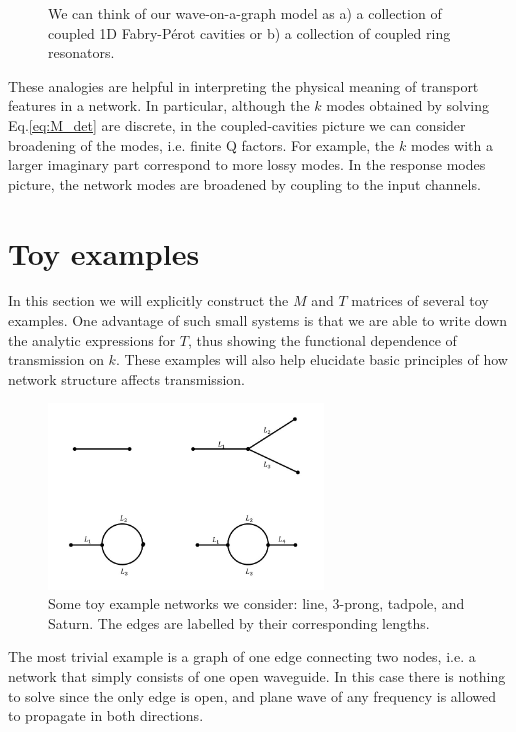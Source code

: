 \begin{figure}[h]
\begin{subfigure}[b]{0.3\textwidth}
        \caption{}
    \end{subfigure}
    
    \caption{We can think of our wave-on-a-graph model as a) a collection of coupled 1D Fabry-P\'erot cavities or b) a collection of coupled ring resonators.}\label{fig:coupled_FP_rings}
\end{figure}

These analogies are helpful in interpreting the physical meaning of transport features in a network. In particular, although the $k$ modes obtained by solving Eq.\ref{eq:M_det} are discrete, in the coupled-cavities picture we can consider broadening of the modes, i.e. finite Q factors. For example, the $k$ modes with a larger imaginary part correspond to more lossy modes. In the response modes picture, the network modes are broadened by coupling to the input channels.


\section{Toy examples}

In this section we will explicitly construct the $M$ and $T$ matrices of several toy examples. One advantage of such small systems is that we are able to write down the analytic expressions for $T$, thus showing the functional dependence of transmission on $k$. These examples will also help elucidate basic principles of how network structure affects transmission.

\begin{figure}[h]
  \centering
    \includegraphics[width=0.65\textwidth]{ch2/fig2/toy_examples_labeled.jpg}
    \caption{Some toy example networks we consider: line, 3-prong, tadpole, and Saturn. The edges are labelled by their corresponding lengths.}
    \label{fig:toy_examples}
\end{figure}

The most trivial example is a graph of one edge connecting two nodes, i.e. a network that simply consists of one open waveguide. In this case there is nothing to solve since the only edge is open, and plane wave of any frequency is allowed to propagate in both directions.

